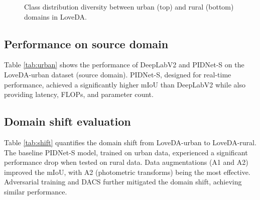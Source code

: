 \documentclass{article}
\begin{document}
\begin{multicols}{2}
\begin{figure}[H]
\begin{minipage}{1\linewidth}
			\end{minipage}
			\caption{Class distribution diversity between urban (top) and rural (bottom) domains in LoveDA.}  
			\label{fig:class_div}  

		\end{figure}


		\subsection{Performance on source domain}
		Table \ref{tab:urban} shows the performance of DeepLabV2 and PIDNet-S on the LoveDA-urban dataset (source domain). PIDNet-S, designed for real-time performance, achieved a significantly higher mIoU than DeepLabV2 while also providing latency, FLOPs, and parameter count.


		\begin{table}[H]
			\centering
			\renewcommand{\arraystretch}{1.2} %
			\setlength{\tabcolsep}{6pt} %
			\label{tab:urban}
			\caption{Performance comparison of different hyperparameter tuning.}

		\end{table}




		\subsection{Domain shift evaluation}
		\small
		Table \ref{tab:shift} quantifies the domain shift from LoveDA-urban to LoveDA-rural. The baseline PIDNet-S model, trained on urban data, experienced a significant performance drop when tested on rural data. Data augmentations (A1 and A2) improved the mIoU, with A2 (photometric transforms) being the most effective. Adversarial training and DACS further mitigated the domain shift, achieving similar performance.
		
	


\end{multicols}
\end{document}

